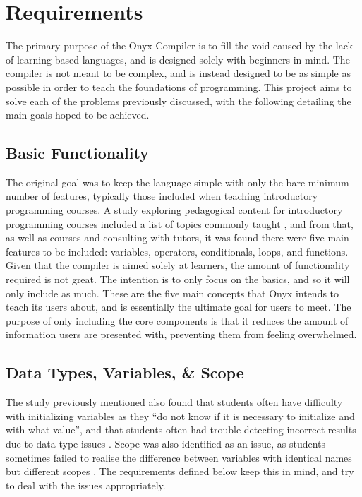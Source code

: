\documentclass[
]{report}
\begin{document}
\chapter{Requirements}
The primary purpose of the Onyx Compiler is to fill the void caused by
the lack of learning-based languages, and is designed solely with
beginners in mind. The compiler is not meant to be complex, and is
instead designed to be as simple as possible in order to teach the
foundations of programming. This project aims to solve each of the
problems previously discussed, with the following detailing the main
goals hoped to be achieved.

\section{Basic Functionality}
The original goal was to keep the language simple with only the bare
minimum number of features, typically those included when teaching introductory
programming courses. A study exploring pedagogical content for
introductory programming courses included a list of topics commonly
taught \cite{pedagogical-report}, and from that, as well as courses and consulting with
tutors, it was found there were five main features to be included:
variables, operators, conditionals, loops, and functions. Given that the
compiler is aimed solely at learners, the amount of functionality
required is not great. The intention is to only focus on the basics, and
so it will only include as much. These are the five main concepts that
Onyx intends to teach its users about, and is essentially the ultimate
goal for users to meet. The purpose of only including the core
components is that it reduces the amount of information users are
presented with, preventing them from feeling overwhelmed.

\section{Data Types, Variables, \& Scope}
The study previously mentioned also found that students often have
difficulty with initializing variables as they ``do not know if it is
necessary to initialize and with what value'', and that students often
had trouble detecting incorrect results due to data type issues
\cite{pedagogical-report}. Scope was also identified as an issue, as students sometimes
failed to realise the difference between variables with identical names
but different scopes \cite{pedagogical-report}. The requirements defined below keep this
in mind, and try to deal with the issues appropriately.
\end{document}
